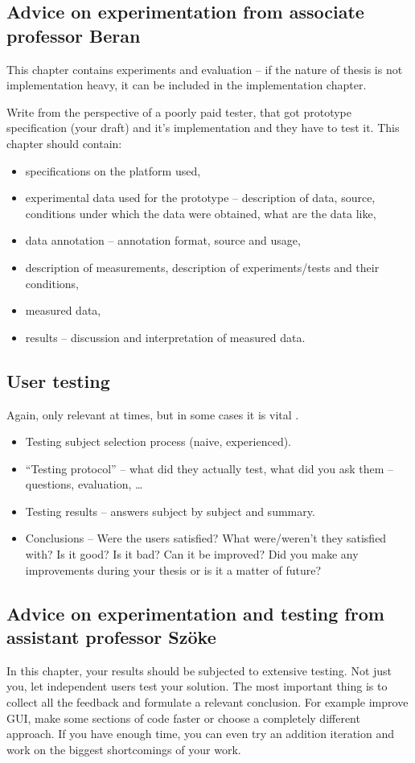 \subsection{Advice on experimentation from associate professor Beran}
This chapter contains experiments and evaluation -- if the nature of thesis is not implementation heavy, it can be included in the implementation chapter.

Write from the perspective of a poorly paid tester, that got prototype specification (your draft) and it's implementation and they have to test it. This chapter should contain:
\begin{itemize}
  \item{specifications on the platform used,}
  \item{experimental data used for the prototype -- description of data, source, conditions under which the data were obtained, what are the data like,}
  \item{data annotation -- annotation format, source and usage,}
  \item{description of measurements, description of experiments/tests and their conditions,}
  \item{measured data,}
  \item{results -- discussion and interpretation of measured data.}
\end{itemize}

\subsection{User testing}

Again, only relevant at times, but in some cases it is vital \cite{Cernocky}.
\begin{itemize}
  \item{Testing subject selection process (naive, experienced).}
  \item{``Testing protocol'' -- what did they actually test, what did you ask them -- questions, evaluation, \ldots}
  \item{Testing results -- answers subject by subject and summary.}
  \item{Conclusions -- Were the users satisfied? What were/weren't they satisfied with? Is it good? Is it bad? Can it be improved? Did you make any improvements during your thesis or is it a matter of future?}
\end{itemize}


\subsection{Advice on experimentation and testing from assistant professor Szöke}
In this chapter, your results should be subjected to extensive testing. Not just you, let independent users test your solution. The most important thing is to collect all the feedback and formulate a relevant conclusion. For example improve GUI, make some sections of code faster or choose a completely different approach. If you have enough time, you can even try an addition iteration and work on the biggest shortcomings of your work.


